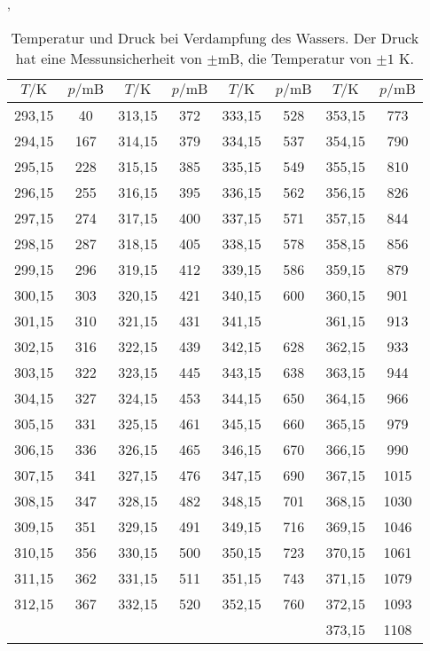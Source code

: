 


\begin{table}
    \centering
    \caption{Temperatur und Druck bei Verdampfung des Wassers. Der Druck hat eine Messunsicherheit von
    $\pm$mB, die Temperatur von $\pm 1$ K.},
    \label{tab:Messreihe_1}
\begin{tabular}{
    c c||c c||c c||c c
}
\toprule 
$T/ \unit{\kelvin}$ & $p / \text{mB}$ & $T/ \unit{\kelvin}$ & $p / \text{mB}$&
$T/ \unit{\kelvin}$ & $p / \text{mB}$ & $T/ \unit{\kelvin}$ & $p / \text{mB}$ \\
\midrule
293,15  & 40   & 313,15  & 372  & 333,15  & 528  & 353,15  & 773 \\
294,15  & 167  & 314,15  & 379  & 334,15  & 537  & 354,15  & 790 \\
295,15  & 228  & 315,15  & 385  & 335,15  & 549  & 355,15  & 810 \\
296,15  & 255  & 316,15  & 395  & 336,15  & 562  & 356,15  & 826 \\
297,15  & 274  & 317,15  & 400  & 337,15  & 571  & 357,15  & 844 \\
298,15  & 287  & 318,15  & 405  & 338,15  & 578  & 358,15  & 856 \\
299,15  & 296  & 319,15  & 412  & 339,15  & 586  & 359,15  & 879 \\
300,15  & 303  & 320,15  & 421  & 340,15  & 600  & 360,15  & 901 \\
301,15  & 310  & 321,15  & 431  & 341,15  & \text{--}  & 361,15  & 913 \\
302,15  & 316  & 322,15  & 439  & 342,15  & 628  & 362,15  & 933 \\
303,15  & 322  & 323,15  & 445  & 343,15  & 638  & 363,15  & 944 \\
304,15  & 327  & 324,15  & 453  & 344,15  & 650  & 364,15  & 966 \\
305,15  & 331  & 325,15  & 461  & 345,15  & 660  & 365,15  & 979 \\
306,15  & 336  & 326,15  & 465  & 346,15  & 670  & 366,15  & 990 \\
307,15  & 341  & 327,15  & 476  & 347,15  & 690  & 367,15  & 1015\\
308,15  & 347  & 328,15  & 482  & 348,15  & 701  & 368,15  & 1030\\
309,15  & 351  & 329,15  & 491  & 349,15  & 716  & 369,15  & 1046\\
310,15  & 356  & 330,15  & 500  & 350,15  & 723  & 370,15  & 1061\\
311,15  & 362  & 331,15  & 511  & 351,15  & 743  & 371,15  & 1079\\
312,15  & 367  & 332,15  & 520  & 352,15  & 760  & 372,15  & 1093\\
        &   &       &       &       &      & 373,15  & 1108 \\
\bottomrule
\end{tabular}
\end{table}
